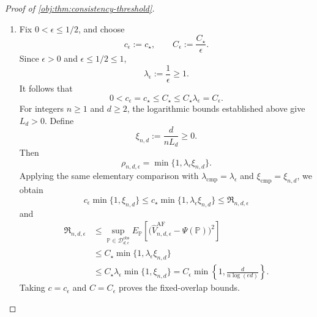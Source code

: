 \begin{proof}[Proof of \cref{obj:thm:consistency-threshold}]
\begin{enumerate}
\item Fix \(0<\epsilon\le1/2\), and choose
\[
c_\epsilon:=c_\star,
\qquad
C_\epsilon:=\frac{C_\star}{\epsilon}.
\]
Since \(\epsilon>0\) and \(\epsilon\le1/2\le1\),
\[
\lambda_\epsilon:=\frac1\epsilon\ge1.
\]
It follows that
\[
0<c_\epsilon=c_\star\le C_\star
\le C_\star\lambda_\epsilon=C_\epsilon.
\]
For integers \(n\ge1\) and \(d\ge2\), the logarithmic bounds established above give \(L_d>0\). Define
\[
\xi_{n,d}:=\frac{d}{nL_d}\ge0.
\]
Then
\[
\rho_{n,d,\epsilon}
=\min\{1,\lambda_\epsilon\xi_{n,d}\}.
\]
Applying the same elementary comparison with
\(\lambda_{\mathrm{cmp}}=\lambda_\epsilon\) and
\(\xi_{\mathrm{cmp}}=\xi_{n,d}\), we obtain
\[
c_\epsilon\min\{1,\xi_{n,d}\}
\le c_\star\min\{1,\lambda_\epsilon\xi_{n,d}\}
\le\mathfrak R_{n,d,\epsilon}
\]
and
\[
\begin{aligned}
\mathfrak R_{n,d,\epsilon}
&\le
\sup_{\mathbb P\in\mathcal D_{d,\epsilon}^{\mathrm{obs}}}
E_{\mathbb P}\!\left[
\bigl(\widehat V_{n,d,\epsilon}^{\mathrm{AF}}-\Psi(\mathbb P)\bigr)^2
\right]\\
&\le C_\star\min\{1,\lambda_\epsilon\xi_{n,d}\}\\
&\le C_\star\lambda_\epsilon\min\{1,\xi_{n,d}\}
=C_\epsilon\min\left\{1,\frac{d}{n\log(ed)}\right\}.
\end{aligned}
\]
Taking \(c=c_\epsilon\) and \(C=C_\epsilon\) proves the fixed-overlap bounds.
\end{enumerate}
\end{proof}

